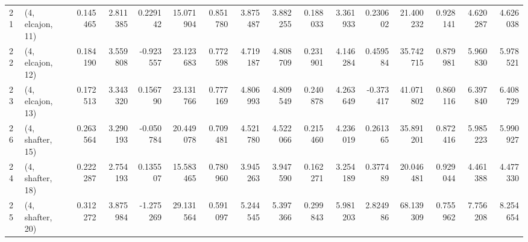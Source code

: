\begin{tabular}{llrrrrrrrrrrrrrr}
21 &  (4, elcajon, 11) &   0.145465 &  2.811385 &  0.229142 &  15.071904 &  0.851780 &   3.875487 &  3.882255 &  0.188033 &   3.361933 &  0.230602 &   21.400232 &  0.928141 &   4.620287 &   4.626038 \\
22 &  (4, elcajon, 12) &   0.184190 &  3.559808 & -0.923557 &  23.123683 &  0.772598 &   4.719187 &  4.808709 &  0.231901 &   4.146284 &  0.459584 &   35.742715 &  0.879981 &   5.960830 &   5.978521 \\
23 &  (4, elcajon, 13) &   0.172513 &  3.343320 &  0.156790 &  23.131766 &  0.777169 &   4.806993 &  4.809549 &  0.240878 &   4.263649 & -0.373417 &   41.071802 &  0.860116 &   6.397840 &   6.408729 \\
26 &  (4, shafter, 15) &   0.263564 &  3.290193 & -0.050784 &  20.449078 &  0.709481 &   4.521780 &  4.522066 &  0.215460 &   4.236019 &  0.261365 &   35.891201 &  0.872416 &   5.985223 &   5.990927 \\
24 &  (4, shafter, 18) &   0.222287 &  2.754193 &  0.135507 &  15.583465 &  0.780960 &   3.945263 &  3.947590 &  0.162271 &   3.254189 &  0.377489 &   20.046481 &  0.929044 &   4.461388 &   4.477330 \\
25 &  (4, shafter, 20) &   0.312272 &  3.875984 & -1.275269 &  29.131564 &  0.591097 &   5.244545 &  5.397366 &  0.299843 &   5.981203 &  2.824986 &   68.139309 &  0.755962 &   7.756208 &   8.254654 \\
\bottomrule
\end{tabular}
